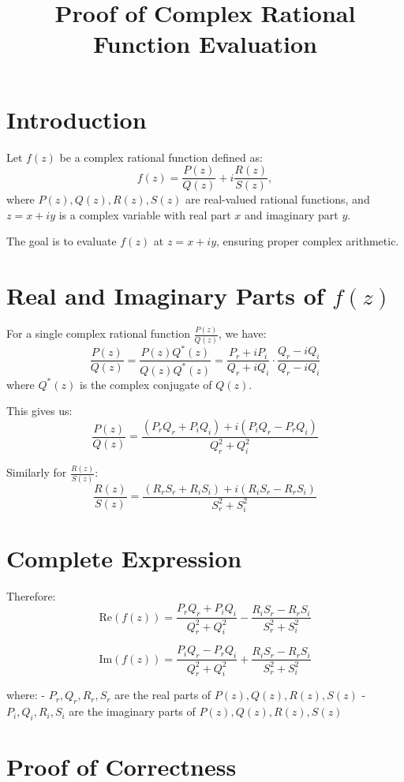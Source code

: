 \documentclass{article}
\title{Proof of Complex Rational Function Evaluation}
\author{}
\date{}
\begin{document}
\maketitle

\section*{Introduction}

Let \( f(z) \) be a complex rational function defined as:
\[
f(z) = \frac{P(z)}{Q(z)} + i \frac{R(z)}{S(z)},
\]
where \( P(z), Q(z), R(z), S(z) \) are real-valued rational functions, and \( z = x + iy \) is a complex variable with real part \( x \) and imaginary part \( y \).

The goal is to evaluate \( f(z) \) at \( z = x + iy \), ensuring proper complex arithmetic.

\section*{Real and Imaginary Parts of \( f(z) \)}

For a single complex rational function \( \frac{P(z)}{Q(z)} \), we have:
\[
\frac{P(z)}{Q(z)} = \frac{P(z)Q^*(z)}{Q(z)Q^*(z)} = \frac{P_r + iP_i}{Q_r + iQ_i} \cdot \frac{Q_r - iQ_i}{Q_r - iQ_i}
\]
where \( Q^*(z) \) is the complex conjugate of \( Q(z) \).

This gives us:
\[
\frac{P(z)}{Q(z)} = \frac{(P_rQ_r + P_iQ_i) + i(P_iQ_r - P_rQ_i)}{Q_r^2 + Q_i^2}
\]

Similarly for \( \frac{R(z)}{S(z)} \):
\[
\frac{R(z)}{S(z)} = \frac{(R_rS_r + R_iS_i) + i(R_iS_r - R_rS_i)}{S_r^2 + S_i^2}
\]

\section*{Complete Expression}

Therefore:
\[
\text{Re}(f(z)) = \frac{P_rQ_r + P_iQ_i}{Q_r^2 + Q_i^2} - \frac{R_iS_r - R_rS_i}{S_r^2 + S_i^2}
\]

\[
\text{Im}(f(z)) = \frac{P_iQ_r - P_rQ_i}{Q_r^2 + Q_i^2} + \frac{R_iS_r - R_rS_i}{S_r^2 + S_i^2}
\]

where:
- \( P_r, Q_r, R_r, S_r \) are the real parts of \( P(z), Q(z), R(z), S(z) \)
- \( P_i, Q_i, R_i, S_i \) are the imaginary parts of \( P(z), Q(z), R(z), S(z) \)

\section*{Proof of Correctness}
\end{document}
